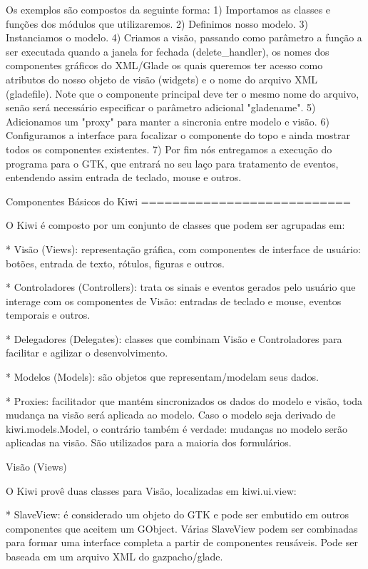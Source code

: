 Os exemplos são compostos da seguinte forma:
1) Importamos as classes e funções dos módulos que utilizaremos.
2) Definimos nosso modelo.
3) Instanciamos o modelo.
4) Criamos a visão, passando como parâmetro a função a ser executada
   quando a janela for fechada (delete_handler), os nomes dos
   componentes gráficos do XML/Glade os quais queremos ter acesso como
   atributos do nosso objeto de visão (widgets) e o nome do arquivo
   XML (gladefile). Note que o componente principal deve ter o mesmo
   nome do arquivo, senão será necessário especificar o parâmetro
   adicional "gladename".
5) Adicionamos um "proxy" para manter a sincronia entre modelo e
   visão.
6) Configuramos a interface para focalizar o componente do topo e
   ainda mostrar todos os componentes existentes.
7) Por fim nós entregamos a execução do programa para o GTK, que
   entrará no seu laço para tratamento de eventos, entendendo assim
   entrada de teclado, mouse e outros.


Componentes Básicos do Kiwi
===========================

O Kiwi é composto por um conjunto de classes que podem ser agrupadas
em:

 * Visão (Views): representação gráfica, com componentes de interface
   de usuário: botões, entrada de texto, rótulos, figuras e outros.

 * Controladores (Controllers): trata os sinais e eventos gerados pelo
   usuário que interage com os componentes de Visão: entradas de
   teclado e mouse, eventos temporais e outros.

 * Delegadores (Delegates): classes que combinam Visão e
   Controladores para facilitar e agilizar o desenvolvimento.

 * Modelos (Models): são objetos que representam/modelam seus dados.

 * Proxies: facilitador que mantém sincronizados os dados do modelo e
   visão, toda mudança na visão será aplicada ao modelo. Caso o modelo
   seja derivado de kiwi.models.Model, o contrário também é verdade:
   mudanças no modelo serão aplicadas na visão. São utilizados para a
   maioria dos formulários.


Visão (Views)
~~~~~~~~~~~~~

O Kiwi provê duas classes para Visão, localizadas em kiwi.ui.view:

 * SlaveView: é considerado um objeto do GTK e pode ser embutido em
   outros componentes que aceitem um GObject. Várias SlaveView podem
   ser combinadas para formar uma interface completa a partir de
   componentes reusáveis.  Pode ser baseada em um arquivo XML do
   gazpacho/glade.


